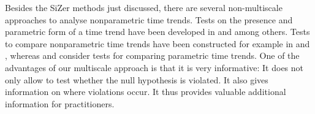 Besides the SiZer methods just discussed, there are several non-multiscale approaches to analyse nonparametric time trends. Tests on the presence and parametric form of a time trend have been developed in \cite{Dette1999} and \cite{ZhangWu2011} among others. Tests to compare nonparametric time trends have been constructed for example in \cite{DegrasWu2012} and \cite{ChenWu2018}, whereas \cite{Vogelsang2005} and \cite{Lyubchich2016} consider tests for comparing parametric time trends. One of the advantages of our multiscale approach is that it is very informative: It does not only allow to test whether the null hypothesis is violated. It also gives information on where violations occur. 
It thus provides valuable additional information for practitioners. 




